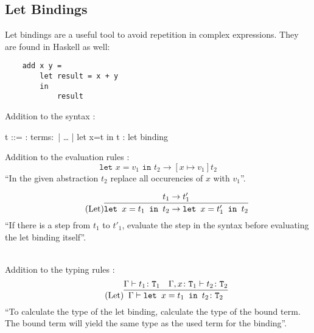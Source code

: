 \subsection{Let Bindings}

Let bindings are a useful tool to avoid repetition in complex expressions.
They are found in Haskell as well:

\begin{verbatim}
    add x y =
        let result = x + y
        in
            result
\end{verbatim}

Addition to the syntax \cite{pierce2002ProgLang}:
\begin{bnfgrammar}
    t ::= : terms$\colon$
    | \dots
    | let x=t in t : let binding
\end{bnfgrammar}\leavevmode\newline

Addition to the evaluation rules \cite{pierce2002ProgLang}:
\begin{equation*}
    \tag{Let-Bind Value}
    \texttt{let } x=v_1 \texttt{ in } t_2 \rightarrow [x \mapsto v_1] t_2
\end{equation*}
``In the given abstraction $t_2$ replace all occurencies of $x$ with $v_1$''.

\begin{equation*}
    \tag{Let}
    \infer{
        \texttt{let } x=t_1 \texttt{ in } t_2 \rightarrow \texttt{let } x=t'_1 \texttt{ in } t_2
    }{
        t_1 \rightarrow t'_1
    }
\end{equation*}
``If there is a step from $t_1$ to $t'_1$, evaluate the step
in the syntax before evaluating the let binding itself''.

~\\
Addition to the typing rules \cite{pierce2002ProgLang}:
\begin{equation*}
    \tag{Let}
    \infer{
        \Gamma \vdash \texttt{let } x=t_1 \texttt{ in } t_2 \colon \texttt{T}_2
    }{
        \Gamma \vdash t_1 \colon \texttt{T}_1 & \Gamma , x \colon \texttt{T}_1 \vdash t_2 \colon \texttt{T}_2
    }
\end{equation*}
``To calculate the type of the let binding, calculate the type of the bound term. The bound
term will yield the same type as the used term for the binding''.
